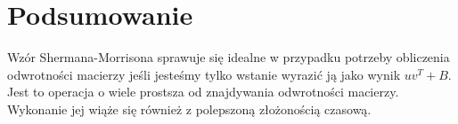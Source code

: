 \documentclass{article}
\begin{document}
  \section{Podsumowanie}
  Wzór Shermana-Morrisona sprawuje się idealne w przypadku potrzeby obliczenia odwrotności macierzy jeśli jesteśmy tylko wstanie wyrazić ją jako wynik $uv^T + B$. Jest to operacja o wiele prostsza od znajdywania odwrotności macierzy. Wykonanie jej wiąże się również z polepszoną złożonością czasową. 
\end{document}
